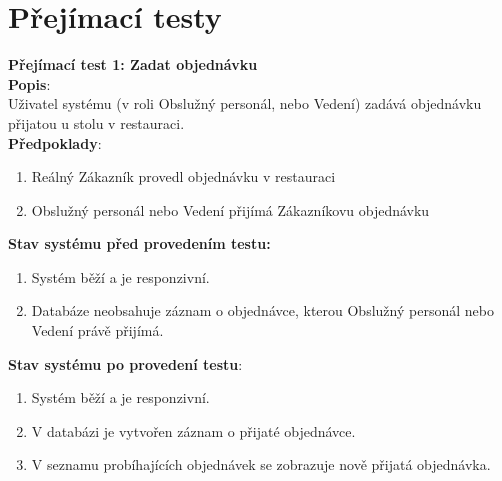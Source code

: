 \documentclass[a4paper,10pt]{article}
\begin{document}
\newpage
\section*{Přejímací testy}

{\large\textbf{Přejímací test 1: Zadat objednávku}} \\

\textbf{Popis}: \\\indent Uživatel systému (v roli Obslužný personál, nebo Vedení) zadává objednávku přijatou u stolu v restauraci. \\

\textbf{Předpoklady}: 
\begin{enumerate}
	\item Reálný Zákazník provedl objednávku v restauraci
	\item Obslužný personál nebo Vedení přijímá Zákazníkovu objednávku
\end{enumerate}

\textbf{Stav systému před provedením testu:}
\begin{enumerate}
	\item Systém běží a je responzivní.
	\item Databáze neobsahuje záznam o objednávce, kterou Obslužný personál nebo Vedení právě přijímá. 
\end{enumerate}

\textbf{Stav systému po provedení testu}:
\begin{enumerate}
	\item Systém běží a je responzivní.
	\item V databázi je vytvořen záznam o přijaté objednávce.
	\item V seznamu probíhajících objednávek se zobrazuje nově přijatá objednávka.
\end{enumerate}
\end{document}
